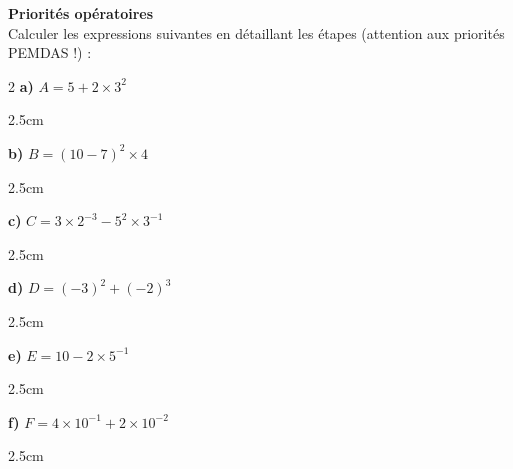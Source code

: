 \documentclass[a4paper]{book}
\begin{document}
    \begin{exercice} \textbf{Priorités opératoires} \\
        Calculer les expressions suivantes en détaillant les étapes (attention aux priorités PEMDAS !) :
        
        \begin{multicols}{2}
            \textbf{a)} $A = 5 + 2 \times 3^2$
            \begin{ZoneReponse}{2.5cm}
            \end{ZoneReponse}
            
            \textbf{b)} $B = (10 - 7)^2 \times 4$
            \begin{ZoneReponse}{2.5cm}
            \end{ZoneReponse}
            
            \textbf{c)} $C = 3 \times 2^{-3} - 5^2\times3^{-1}$
            \begin{ZoneReponse}{2.5cm}
            \end{ZoneReponse}
            
            \textbf{d)} $D = (-3)^2 + (-2)^3$
            \begin{ZoneReponse}{2.5cm}
            \end{ZoneReponse}
            
            \textbf{e)} $E = 10 - 2 \times 5^{-1}$
            \begin{ZoneReponse}{2.5cm}
            \end{ZoneReponse}
            
            \textbf{f)} $F = 4 \times 10^{-1} + 2 \times 10^{-2}$
            \begin{ZoneReponse}{2.5cm}
            \end{ZoneReponse}
        \end{multicols}
    
    \end{exercice}
\end{document}
